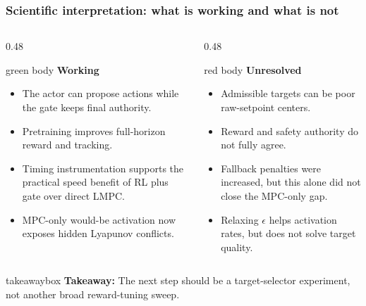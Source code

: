\documentclass[aspectratio=169]{beamer}
\newcommand{\takeawaybox}[1]{%
\vspace{0.03cm}
\begin{center}
\begin{beamercolorbox}[wd=0.94\textwidth,sep=3pt,center,rounded=true,shadow=false]{takeawaybox}
\scriptsize
\textbf{\textcolor{maroon1}{Takeaway:}} #1
\end{beamercolorbox}
\end{center}
}
\begin{document}
\begin{frame}
\frametitle{\large \textbf{Scientific interpretation: what is working and what is not}}
\scriptsize

\begin{columns}[T,onlytextwidth]
\begin{column}{0.48\textwidth}
\begin{beamercolorbox}[rounded=true,sep=4pt]{green body}
\textbf{\textcolor{maccgreen}{Working}}
\begin{itemize}\justifying
  \setlength\itemsep{0.35ex}
  \item The actor can propose actions while the gate keeps final authority.
  \item Pretraining improves full-horizon reward and tracking.
  \item Timing instrumentation supports the practical speed benefit of RL plus gate over direct LMPC.
  \item MPC-only would-be activation now exposes hidden Lyapunov conflicts.
\end{itemize}
\end{beamercolorbox}
\end{column}

\begin{column}{0.48\textwidth}
\begin{beamercolorbox}[rounded=true,sep=4pt]{red body}
\textbf{\textcolor{maccred}{Unresolved}}
\begin{itemize}\justifying
  \setlength\itemsep{0.35ex}
  \item Admissible targets can be poor raw-setpoint centers.
  \item Reward and safety authority do not fully agree.
  \item Fallback penalties were increased, but this alone did not close the MPC-only gap.
  \item Relaxing $\epsilon$ helps activation rates, but does not solve target quality.
\end{itemize}
\end{beamercolorbox}
\end{column}
\end{columns}

\takeawaybox{The next step should be a target-selector experiment, not another broad reward-tuning sweep.}
\end{frame}
\end{document}
